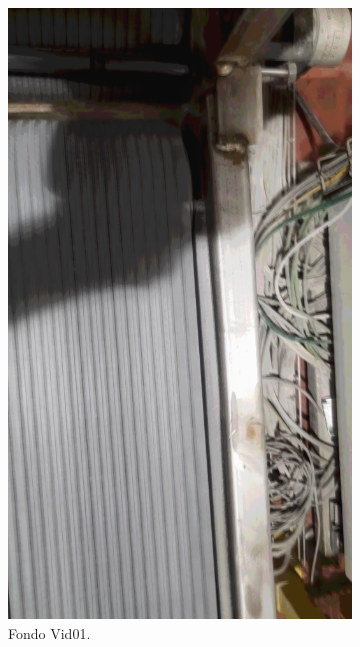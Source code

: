 \documentclass[11pt]{memoir}
\begin{document}
\begin{center}
\begin{figure}[H]
\begin{subfigure}{0.3\textwidth}
    \includegraphics[width=\textwidth]{img/F2}
    \caption{Fondo Vid01.}
    \label{fig:fondo-Vid01}
\end{subfigure}
\hfill
\begin{subfigure}{0.3\textwidth}

\end{subfigure}
\end{figure}
\end{center}
\end{document}
